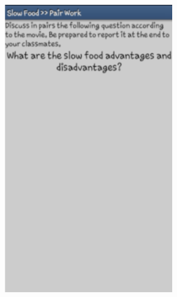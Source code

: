 \documentclass{textolivre}
\begin{document}
\begin{figure}[htbp]
\begin{minipage}[t]{0.35\textwidth}
 \includegraphics[width=\linewidth]{fig9.png}
 \label{fig9}
\end{minipage}
\hfill
\begin{minipage}[t]{0.35\textwidth}

\end{minipage}
\end{figure}
\end{document}
